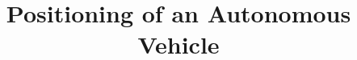 \documentclass[11pt]{article}
\title{Positioning of an Autonomous Vehicle}
\author{\varAuthor}
\begin{document}
\maketitle

{}

\end{document}
